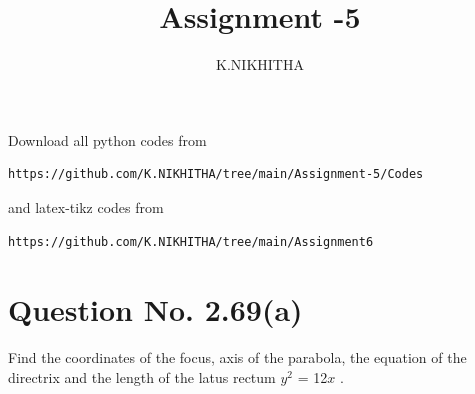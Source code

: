 \documentclass[journal,12pt,twocolumn]{IEEEtran}
\begin{document}
     \def\rightbox#1{\makebox[0in][r]{#1}}
     \def\centbox#1{\makebox[0in]{#1}}
     \def\topbox#1{\raisebox{-\baselineskip}[0in][0in]{#1}}
     \def\midbox#1{\raisebox{-0.5\baselineskip}[0in][0in]{#1}}
\vspace{3cm}
\title{Assignment -5}
\author{K.NIKHITHA}
\maketitle
\newpage
\bigskip
\renewcommand{\thefigure}{\theenumi}
\renewcommand{\thetable}{\theenumi}
Download all python codes from 
\begin{lstlisting}
https://github.com/K.NIKHITHA/tree/main/Assignment-5/Codes
\end{lstlisting}
%
and latex-tikz codes from 
%
\begin{lstlisting}
https://github.com/K.NIKHITHA/tree/main/Assignment6
\end{lstlisting}
%
\section{Question No. 2.69(a)}
Find the coordinates of the focus, axis of the parabola, the equation of the directrix and the length of the latus rectum   $y^2$ = 12$x$ .
%
\end{document}
